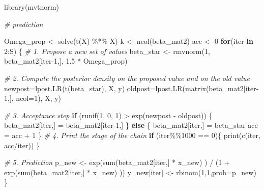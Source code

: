 \documentclass[
]{article}
\newenvironment{Shaded}{\begin{snugshade}}{\end{snugshade}}
\newcommand{\AttributeTok}[1]{\textcolor[rgb]{0.77,0.63,0.00}{#1}}
\newcommand{\CommentTok}[1]{\textcolor[rgb]{0.56,0.35,0.01}{\textit{#1}}}
\newcommand{\ControlFlowTok}[1]{\textcolor[rgb]{0.13,0.29,0.53}{\textbf{#1}}}
\newcommand{\DecValTok}[1]{\textcolor[rgb]{0.00,0.00,0.81}{#1}}
\newcommand{\FloatTok}[1]{\textcolor[rgb]{0.00,0.00,0.81}{#1}}
\newcommand{\FunctionTok}[1]{\textcolor[rgb]{0.00,0.00,0.00}{#1}}
\newcommand{\NormalTok}[1]{#1}
\newcommand{\OtherTok}[1]{\textcolor[rgb]{0.56,0.35,0.01}{#1}}
\newcommand{\SpecialCharTok}[1]{\textcolor[rgb]{0.00,0.00,0.00}{#1}}
\begin{document}
\begin{Shaded}
\begin{Highlighting}[]
\FunctionTok{library}\NormalTok{(mvtnorm)}

\CommentTok{\# prediction}

\NormalTok{Omega\_prop }\OtherTok{\textless{}{-}} \FunctionTok{solve}\NormalTok{(}\FunctionTok{t}\NormalTok{(X) }\SpecialCharTok{\%*\%}\NormalTok{ X)}
\NormalTok{k }\OtherTok{\textless{}{-}} \FunctionTok{ncol}\NormalTok{(beta\_mat2)}
\NormalTok{acc }\OtherTok{\textless{}{-}} \DecValTok{0}
\ControlFlowTok{for}\NormalTok{(iter }\ControlFlowTok{in} \DecValTok{2}\SpecialCharTok{:}\NormalTok{S)}
\NormalTok{\{}
  \CommentTok{\# 1. Propose a new set of values}
\NormalTok{  beta\_star }\OtherTok{\textless{}{-}} \FunctionTok{rmvnorm}\NormalTok{(}\DecValTok{1}\NormalTok{, beta\_mat2[iter}\DecValTok{{-}1}\NormalTok{,], }\FloatTok{1.5} \SpecialCharTok{*}\NormalTok{ Omega\_prop)}
  
  \CommentTok{\# 2. Compute the posterior density on the proposed value and on the old value  }
\NormalTok{  newpost}\OtherTok{=}\FunctionTok{lpost.LR}\NormalTok{(}\FunctionTok{t}\NormalTok{(beta\_star), X, y)}
\NormalTok{  oldpost}\OtherTok{=}\FunctionTok{lpost.LR}\NormalTok{(}\FunctionTok{matrix}\NormalTok{(beta\_mat2[iter}\DecValTok{{-}1}\NormalTok{,], }\AttributeTok{ncol=}\DecValTok{1}\NormalTok{), X, y)}
  
  \CommentTok{\# 3. Acceptance step}
  \ControlFlowTok{if}\NormalTok{ (}\FunctionTok{runif}\NormalTok{(}\DecValTok{1}\NormalTok{, }\DecValTok{0}\NormalTok{, }\DecValTok{1}\NormalTok{) }\SpecialCharTok{\textgreater{}} \FunctionTok{exp}\NormalTok{(newpost }\SpecialCharTok{{-}}\NormalTok{ oldpost)) \{}
\NormalTok{    beta\_mat2[iter,] }\OtherTok{=}\NormalTok{ beta\_mat2[iter}\DecValTok{{-}1}\NormalTok{,]}
\NormalTok{  \} }\ControlFlowTok{else}\NormalTok{ \{}
\NormalTok{    beta\_mat2[iter,] }\OtherTok{=}\NormalTok{ beta\_star}
\NormalTok{    acc }\OtherTok{=}\NormalTok{ acc }\SpecialCharTok{+} \DecValTok{1}
\NormalTok{  \}}
  \CommentTok{\# 4. Print the stage of the chain}
  \ControlFlowTok{if}\NormalTok{ (iter}\SpecialCharTok{\%\%}\DecValTok{1000} \SpecialCharTok{==} \DecValTok{0}\NormalTok{)\{ }\FunctionTok{print}\NormalTok{(}\FunctionTok{c}\NormalTok{(iter, acc}\SpecialCharTok{/}\NormalTok{iter)) \}}
  
  \CommentTok{\# 5. Prediction }
\NormalTok{  p\_new }\OtherTok{\textless{}{-}} \FunctionTok{exp}\NormalTok{(}\FunctionTok{sum}\NormalTok{(beta\_mat2[iter,] }\SpecialCharTok{*}\NormalTok{ x\_new) ) }\SpecialCharTok{/}\NormalTok{ (}\DecValTok{1} \SpecialCharTok{+} \FunctionTok{exp}\NormalTok{(}\FunctionTok{sum}\NormalTok{(beta\_mat2[iter,] }\SpecialCharTok{*}\NormalTok{ x\_new) ))}
\NormalTok{  y\_new[iter] }\OtherTok{\textless{}{-}} \FunctionTok{rbinom}\NormalTok{(}\DecValTok{1}\NormalTok{,}\DecValTok{1}\NormalTok{,}\AttributeTok{prob=}\NormalTok{p\_new)}
\NormalTok{\}}
\end{Highlighting}
\end{Shaded}
\end{document}
